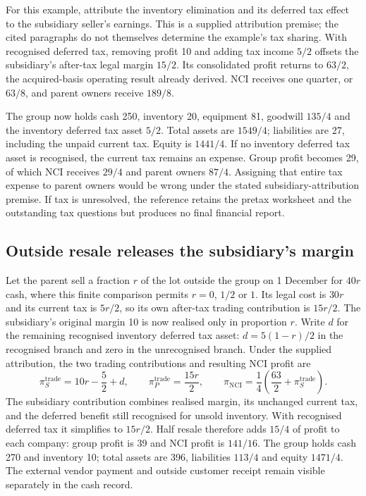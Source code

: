 For this example, attribute the inventory elimination and its deferred tax
effect to the subsidiary seller's earnings. This is a supplied attribution
premise; the cited paragraphs do not themselves determine the example's tax
sharing. With recognised deferred tax, removing profit 10 and adding tax income
$5/2$ offsets the subsidiary's after-tax legal margin $15/2$. Its consolidated
profit returns to $63/2$, the acquired-basis operating result already derived.
NCI receives one quarter, or $63/8$, and parent owners receive $189/8$.

The group now holds cash 250, inventory 20, equipment 81, goodwill $135/4$
and the inventory deferred tax asset $5/2$. Total assets are $1549/4$;
liabilities are 27, including the unpaid current tax. Equity is $1441/4$.
If no inventory deferred tax asset is recognised, the current tax remains an
expense. Group profit becomes 29, of which NCI receives $29/4$ and parent
owners $87/4$. Assigning that entire tax expense to parent owners would be
wrong under the stated subsidiary-attribution premise. If tax is unresolved,
the reference retains the pretax worksheet and the outstanding tax questions
but produces no final financial report.

\subsection{Outside resale releases the subsidiary's margin}

Let the parent sell a fraction $r$ of the lot outside the group on 1 December
for $40r$ cash, where this finite comparison permits $r=0$, $1/2$ or $1$.
Its legal cost is $30r$ and its current tax is $5r/2$, so its own after-tax
trading contribution is $15r/2$. The subsidiary's original margin 10 is now
realised only in proportion $r$. Write $d$ for the remaining recognised
inventory deferred tax asset: $d=5(1-r)/2$ in the recognised branch and zero
in the unrecognised branch. Under the supplied attribution, the two trading
contributions and resulting NCI profit are
\[
 \pi_S^{\mathrm{trade}}=10r-\frac52+d,\qquad
 \pi_P^{\mathrm{trade}}=\frac{15r}{2},\qquad
 \pi_{\mathrm{NCI}}=\frac14
       \left(\frac{63}{2}+\pi_S^{\mathrm{trade}}\right).
\]
The subsidiary contribution combines realised margin, its unchanged current
tax, and the deferred benefit still recognised for unsold inventory. With
recognised deferred tax it simplifies to $15r/2$. Half resale therefore adds
$15/4$ of profit to each company: group profit is 39 and NCI profit is $141/16$.
The group holds cash 270 and inventory 10; total assets are 396, liabilities
$113/4$ and equity $1471/4$. The external vendor payment and outside customer
receipt remain visible separately in the cash record.

